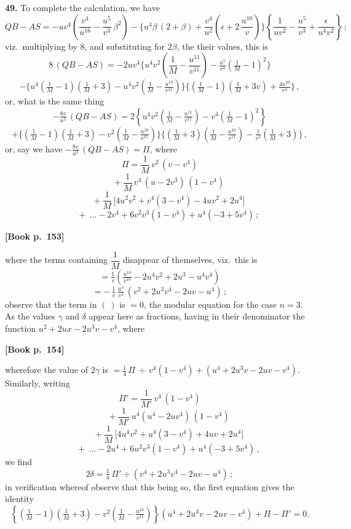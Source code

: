 \documentclass[11pt]{article}
\begin{document}
\textbf{49.} To complete the calculation, we have
\[
QB - AS = -u v^4\!\left(\frac{v^4}{u^{16}} - \frac{u^5}{v^3}\,\beta^2\right)
- \biggl\{u^4\beta\,(2 + \beta) + \frac{v^4}{u^2}\!\left(\epsilon + 2\,\frac{u^{10}}{v}\right)\biggr\}\!\left\{\frac{1}{u v^2} - \frac{u^5}{v^3} + \frac{\epsilon}{u^4 v^2}\right\}\,;
\]
viz.\ multiplying by 8, and substituting for $2\beta$, the their values, this is
\[
8\,(QB - AS) = -2uv^4\!\biggl\{u^4 v^2\!\left(\frac{1}{M} - \frac{u^{11}}{v^{11}}\right) - \tfrac{u^5}{v^4}\!\left(\tfrac{1}{M} - 1\right)^{\!2}\biggr\}
\]
\[
- \biggl\{u^4\!\left(\tfrac{1}{M} - 1\right)\!\left(\tfrac{1}{M} + 3\right) - u^4 v^2\!\left(\tfrac{1}{M} - \tfrac{u^{10}}{v^{11}}\right)\biggr\}\!\biggl\{\!\left(\tfrac{1}{M} - 1\right)\!\left(\tfrac{1}{M} + 3v\right) + \tfrac{4 u^{10}}{v^4}\!\biggr\}\,,
\]
or, what is the same thing
\[
-\tfrac{8v}{u^2}\,(QB - AS) = 2\!\left\{u^4 v^2\!\left(\tfrac{1}{M} - \tfrac{u^{11}}{v^{11}}\right) - v^4\!\left(\tfrac{1}{M} - 1\right)^{\!2}\right\}
\]
\[
+ \biggl\{\!\left(\tfrac{1}{M} - 1\right)\!\left(\tfrac{1}{M} + 3\right) - v^2\!\left(\tfrac{1}{M} - \tfrac{u^{10}}{v^{11}}\right)\!\biggr\}\biggl\{\!\left(\tfrac{1}{M} + 3\right)\!\left(\tfrac{1}{M} - \tfrac{u^{10}}{v^{11}}\right) - \tfrac{1}{v^2}\!\left(\tfrac{1}{M} + 3\right)\biggr\}\,,
\]
or, say we have $-\tfrac{8v}{u^2}\,(QB - AS) = \Pi$, where
\[
\Pi = \frac{1}{M}\,v^2\,(v - v^4)
\]
\[
\qquad + \frac{1}{M}\,v^4\,(u - 2v^3)\,(1 - v^4)
\]
\[
\qquad + \frac{1}{M}\,\bigl[4u^2 v^2 + v^4(3 - v^4) - 4u v^2 + 2u^4\bigr]
\]
\[
\qquad +\ \ldots - 2v^4 + 6v^2 v^3 (1 - v^4) + u^4(-3 + 5v^4)\,;
\]

\bigskip

\noindent\textbf{[Book p.~153]}

\medskip

\noindent
where the terms containing $\dfrac{1}{M}$ disappear of themselves, viz.\ this is
\[
= \tfrac{1}{v}\!\left(\tfrac{u^{10}}{v^{10}} - 2u^4 v^2 + 2u^3 - u^4 v^4\right)
\]
\[
= -\,\tfrac{1}{v}\,\tfrac{u^4}{v^2}\,(v^2 + 2u^3 v^4 - 2uv - u^4)\,;
\]
observe that the term in $(\ )$ is $= 0$, the modular equation for the case $n=3$. As
the values $\gamma$ and $\delta$ appear here as fractions, having in their denominator
the function $u^2 + 2ux - 2u^3 v - v^4$, where

\medskip

\bigskip

\noindent\textbf{[Book p.~154]}

\medskip

\noindent
wherefore the value of $2\gamma$ is $=\tfrac{1}{4}\,\Pi\,\div\,v^4(1 - v^4) + (u^4 + 2u^3 v - 2uv - v^4)$. Similarly, writing
\[
\Pi' = \frac{1}{M'}\,v^4\,(1 - v^4)
\]
\[
\qquad + \frac{1}{M'}\,u^4(u^4 - 2u v^4)\,(1 - v^4)
\]
\[
\qquad + \frac{1}{M}\,\bigl[4u^4 v^2 + u^4(3 - v^4) + 4uv + 2u^4\bigr]
\]
\[
\qquad +\ \ldots - 2u^4 + 6u^2 v^3(1 - v^4) + u^4(-3 + 5v^4)\,,
\]
we find
\[
2\delta = \tfrac{1}{u}\,\Pi' \div (v^4 + 2u^3 v^4 - 2uv - u^4)\,;
\]
in verification whereof observe that this being so, the first equation gives the identity
\[
\!\left\{\!\left(\tfrac{1}{M} - 1\right)\!\left(\tfrac{1}{M} + 3\right) - v^2\!\left(\tfrac{1}{M} - \tfrac{u^{10}}{v^{11}}\right)\!\right\}(u^4 + 2u^3 v - 2uv - v^4) + \Pi - \Pi' = 0.
\]
\end{document}
